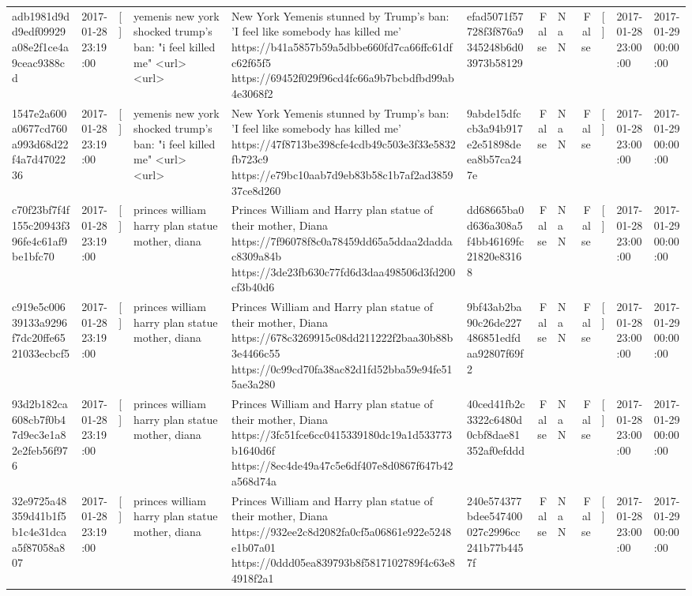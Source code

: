 \begin{tabular}{llllllrlrlll}
adb1981d9dd9edf09929a08e2f1ce4a9ceac9388cd & 2017-01-28 23:19:00 & [] & yemenis new york shocked trump's ban: "i feel killed me" <url> <url> & New York Yemenis stunned by Trump's ban: 'I feel like somebody has killed me' https://b41a5857b59a5dbbe660fd7ca66ffc61dfc62f65f5 https://69452f029f96cd4fc66a9b7bcbdfbd99ab4e3068f2 & efad5071f57728f3f876a9345248b6d03973b58129 & False & NaN & False & [] & 2017-01-28 23:00:00 & 2017-01-29 00:00:00 \\
1547e2a600a0677cd760a993d68d22f4a7d4702236 & 2017-01-28 23:19:00 & [] & yemenis new york shocked trump's ban: "i feel killed me" <url> <url> & New York Yemenis stunned by Trump's ban: 'I feel like somebody has killed me' https://47f8713be398cfe4cdb49c503e3f33e5832fb723c9 https://e79bc10aab7d9eb83b58c1b7af2ad385937ce8d260 & 9abde15dfccb3a94b917e2e51898deea8b57ca247e & False & NaN & False & [] & 2017-01-28 23:00:00 & 2017-01-29 00:00:00 \\
c70f23bf7f4f155c20943f396fe4c61af9be1bfc70 & 2017-01-28 23:19:00 & [] & princes william harry plan statue mother, diana & Princes William and Harry plan statue of their mother, Diana https://7f96078f8c0a78459dd65a5ddaa2daddac8309a84b https://3de23fb630c77fd6d3daa498506d3fd200cf3b40d6 & dd68665ba0d636a308a5f4bb46169fc21820e83168 & False & NaN & False & [] & 2017-01-28 23:00:00 & 2017-01-29 00:00:00 \\
c919e5c00639133a9296f7dc20ffe6521033ecbcf5 & 2017-01-28 23:19:00 & [] & princes william harry plan statue mother, diana & Princes William and Harry plan statue of their mother, Diana https://678c3269915c08dd211222f2baa30b88b3e4466c55 https://0c99cd70fa38ac82d1fd52bba59e94fe515ae3a280 & 9bf43ab2ba90c26de227486851edfdaa92807f69f2 & False & NaN & False & [] & 2017-01-28 23:00:00 & 2017-01-29 00:00:00 \\
93d2b182ca608cb7f0b47d9ec3e1a82e2feb56f976 & 2017-01-28 23:19:00 & [] & princes william harry plan statue mother, diana & Princes William and Harry plan statue of their mother, Diana https://3fc51fce6cc0415339180dc19a1d533773b1640d6f https://8ec4de49a47c5e6df407e8d0867f647b42a568d74a & 40ced41fb2c3322c6480d0cbf8dae81352af0efddd & False & NaN & False & [] & 2017-01-28 23:00:00 & 2017-01-29 00:00:00 \\
32e9725a48359d41b1f5b1c4e31dcaa5f87058a807 & 2017-01-28 23:19:00 & [] & princes william harry plan statue mother, diana & Princes William and Harry plan statue of their mother, Diana https://932ee2c8d2082fa0cf5a06861e922e5248e1b07a01 https://0ddd05ea839793b8f5817102789f4c63e84918f2a1 & 240e574377bdee547400027c2996cc241b77b4457f & False & NaN & False & [] & 2017-01-28 23:00:00 & 2017-01-29 00:00:00 \\

\end{tabular}
